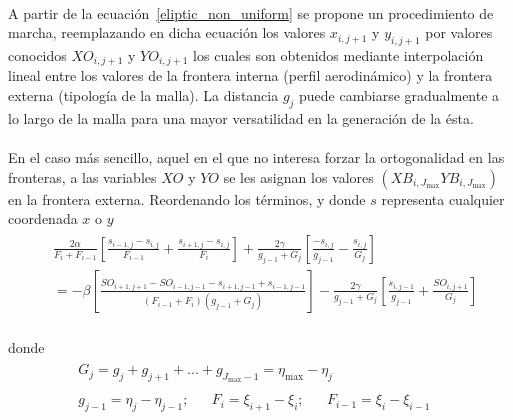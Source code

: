 \documentclass[letterpaper, openright, 12pt]{book}
\begin{document}
    \paragraph*{}
    A partir de la ecuación~\ref{eliptic_non_uniform} se propone un
    procedimiento de marcha, reemplazando en dicha ecuación los valores
    $x_{i, j + 1}$ y $y_{i, j+1}$ por valores conocidos $XO_{i, j + 1}$ y
    $YO_{i, j + 1}$ los cuales son obtenidos mediante interpolación lineal
    entre los valores de la frontera interna (perfil aerodinámico) y la
    frontera externa (tipología de la malla). La distancia $g_j$ puede
    cambiarse gradualmente a lo largo de la malla para una mayor
    versatilidad en la generación de la ésta.

    \paragraph*{}
    En el caso más sencillo, aquel en el que no interesa forzar la
    ortogonalidad en las fronteras, a las variables $XO$ y $YO$ se les
    asignan los valores $(XB_{i, J_{\max}} YB_{i, J_{\max}})$ en la frontera
    externa. Reordenando los términos, y donde $s$ representa cualquier
    coordenada $x$ o $y$\\
    \begin{align}
        &\begin{aligned}
            &\frac{2\alpha}{F_i + F_{i - 1}} \left[ \frac{s_{i-1, j}
                - s_{i, j}}{F_{i - 1}} + \frac{s_{i+1, j}
                - s_{i, j}}{F_i} \right] + \frac{2\gamma}{g_{j - 1} + G_j}
                \left[ \frac{-s_{i, j}}{g_{j - 1}}
                - \frac{s_{i, j}}{G_j} \right]\\&
            = -\beta \left[ \frac{ SO_{i+1, j+1} - SO_{i-1, j-1} - s_{i+1, j-1}
                + s_{i-1, j-1} }{ (F_{i - 1} + F_i) (g_{j - 1} + G_j) } \right]
                - \frac{2\gamma}{g_{j-1} + G_j}
                \left[ \frac{s_{i, j - 1}}{g_{j - 1}}
                + \frac{SO_{i, j + 1}}{G_j} \right]
        &\end{aligned}
        \label{eliptic_non_uniform1}
    \end{align}\\

    donde
    \begin{align*}
        &\begin{aligned}
            G_j = g_j + g_{j + 1} + ... + g_{J_{\max} - 1} = \eta_{\max} - \eta_j
        \end{aligned}\\
        &\begin{aligned}
        g_{j - 1} = \eta_j - \eta_{j - 1};&& F_i = \xi_{i + 1} - \xi_i; && F_{i - 1} = \xi_i - \xi_{i - 1}&&
        \end{aligned}
    \end{align*}\\
\end{document}
